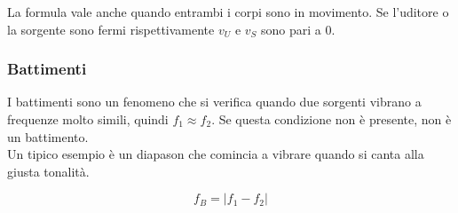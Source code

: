La formula vale anche quando entrambi i corpi sono in movimento. Se l'uditore o la sorgente sono fermi
rispettivamente $v_U$ e $v_S$ sono pari a $0$.

\subsubsection{Battimenti}
I battimenti sono un fenomeno che si verifica quando due sorgenti vibrano a frequenze molto simili,
quindi $f_1 \approx f_2$. Se questa condizione non è presente, non è un battimento.\\
Un tipico esempio è un diapason che comincia a vibrare quando si canta alla giusta tonalità.

\begin{equation*}
  f_B = \left\vert f_1 - f_2 \right\vert
\end{equation*}
